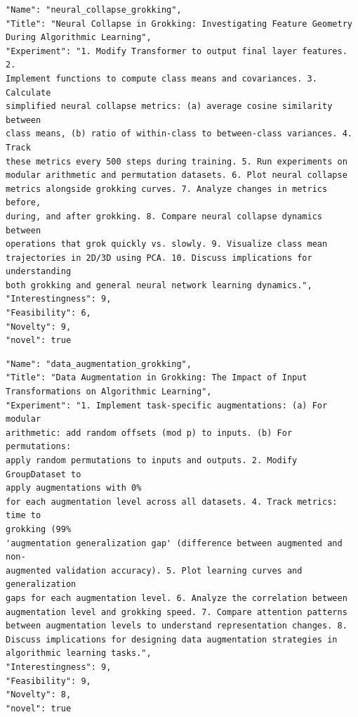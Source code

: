 \begin{tcolorbox}[breakable,colback=blue!5!white, colframe=blue!75!black, title=Idea 27/50 - \texttt{neural\_collapse\_grokking}]
\small
\begin{verbatim}
"Name": "neural_collapse_grokking",
"Title": "Neural Collapse in Grokking: Investigating Feature Geometry
During Algorithmic Learning",
"Experiment": "1. Modify Transformer to output final layer features. 2.
Implement functions to compute class means and covariances. 3. Calculate
simplified neural collapse metrics: (a) average cosine similarity between
class means, (b) ratio of within-class to between-class variances. 4. Track
these metrics every 500 steps during training. 5. Run experiments on
modular arithmetic and permutation datasets. 6. Plot neural collapse
metrics alongside grokking curves. 7. Analyze changes in metrics before,
during, and after grokking. 8. Compare neural collapse dynamics between
operations that grok quickly vs. slowly. 9. Visualize class mean
trajectories in 2D/3D using PCA. 10. Discuss implications for understanding
both grokking and general neural network learning dynamics.",
"Interestingness": 9,
"Feasibility": 6,
"Novelty": 9,
"novel": true
\end{verbatim}
\end{tcolorbox}

\begin{tcolorbox}[breakable,colback=blue!5!white, colframe=blue!75!black, title=Idea 28/50 - \texttt{data\_augmentation\_grokking}]
\small
\begin{verbatim}
"Name": "data_augmentation_grokking",
"Title": "Data Augmentation in Grokking: The Impact of Input
Transformations on Algorithmic Learning",
"Experiment": "1. Implement task-specific augmentations: (a) For modular
arithmetic: add random offsets (mod p) to inputs. (b) For permutations:
apply random permutations to inputs and outputs. 2. Modify GroupDataset to
apply augmentations with 0%
for each augmentation level across all datasets. 4. Track metrics: time to
grokking (99%
'augmentation generalization gap' (difference between augmented and non-
augmented validation accuracy). 5. Plot learning curves and generalization
gaps for each augmentation level. 6. Analyze the correlation between
augmentation level and grokking speed. 7. Compare attention patterns
between augmentation levels to understand representation changes. 8.
Discuss implications for designing data augmentation strategies in
algorithmic learning tasks.",
"Interestingness": 9,
"Feasibility": 9,
"Novelty": 8,
"novel": true
\end{verbatim}
\end{tcolorbox}

